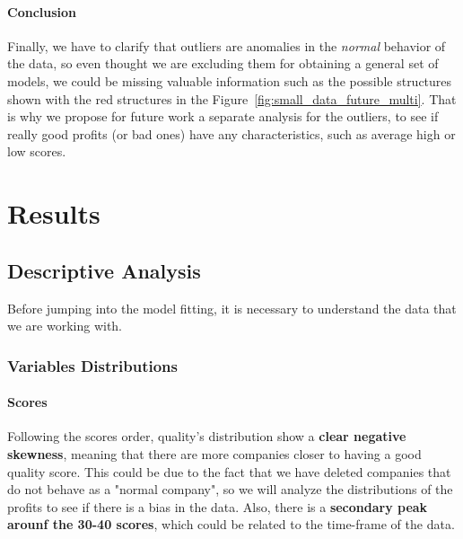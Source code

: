 \documentclass[11pt,english,a4paper,hidelinks]{book}
\begin{document}
\subsubsection{Conclusion}

\noindent Finally, we have to clarify that outliers are anomalies in the \textit{normal} behavior of the data, so even thought we are excluding them for obtaining a general set of models, we could be missing valuable information such as the possible structures shown with the red structures in the Figure~\ref{fig:small_data_future_multi}. That is why we propose for future work a separate analysis for the outliers, to see if really good profits (or bad ones) have any characteristics, such as average high or low scores.


\chapter{Results}
\section{Descriptive Analysis}

Before jumping into the model fitting, it is necessary to understand the data that we are working with.

\subsection{Variables Distributions}

\subsubsection{Scores}
Following the scores order, quality's distribution show a \textbf{clear negative skewness}, meaning that there are more companies closer to having a good quality score. This could be due to the fact that we have deleted companies that do not behave as a "normal company", so we will analyze the distributions of the profits to see if there is a bias in the data. Also, there is a \textbf{secondary peak arounf the 30-40 scores}, which could be related to the time-frame of the data.
\end{document}
